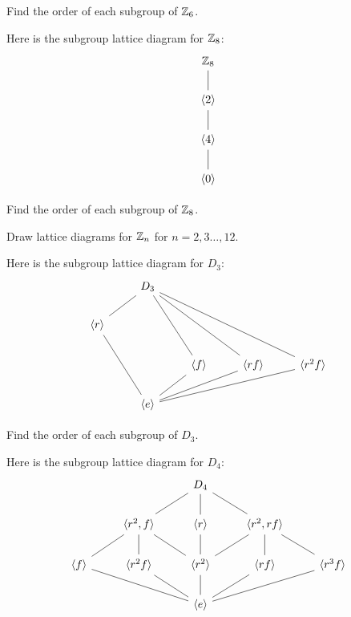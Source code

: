 \documentclass{ximera}
\begin{document}
\begin{exercise}
  Find the order of each subgroup of $\mathbb Z_6$.
\end{exercise}

\begin{example}
  Here is the subgroup lattice diagram for $\mathbb Z_8$:
  \[
  \begin{tikzcd}
    \Z_8  \ar[d,-] \\
    \<2\> \ar[d,-] \\
    \<4\> \ar[d,-] \\   
    \<0\> 
  \end{tikzcd}
  \]
\end{example}

\begin{exercise}
  Find the order of each subgroup of $\mathbb Z_8$.
\end{exercise}

\begin{exercise}
  Draw lattice diagrams for $\mathbb Z_n$ for $n=2,3\dots, 12$.
\end{exercise}

\begin{example}
  Here is the subgroup lattice diagram for $D_3$:
  \[
  \begin{tikzcd}
    & D_3 \ar[rdd,-]\ar[rrdd,-]\ar[rrrdd,-]  \ar[ld,-] & & &      \\
    \<r\> \ar[rdd,-]       &       &  & &  \\
    &       &  \< f\> \ar[ld,-]   &  \< rf\> \ar[lld,-]       &  \< r^2f\> \ar[llld,-]        \\   
    & \<e\> & & &
  \end{tikzcd}
  \]
\end{example}

\begin{exercise}
  Find the order of each subgroup of $D_3$.
\end{exercise}


\begin{example}
  Here is the subgroup lattice diagram for $D_4$:
  \[
  \begin{tikzcd}
    &    & D_4 \ar[rd,-] \ar[d,-] \ar[ld,-] &       \\
    &\<r^2,f\>  \ar[rd,-] \ar[d,-] \ar[ld,-]& \<r \>  \ar[d,-]     & \<r^2,rf\> \ar[ld,-] \ar[d,-] \ar[rd,-]\\
    \<f\>\ar[rrd,-]& \<r^2f\> \ar[rd,-]&\< r^2\> \ar[d,-]  &   \<rf\> \ar[ld,-]& \<r^3f\>\ar[lld,-]     \\   
&     & \<e\> &  &
  \end{tikzcd}
  \]  
\end{example}
\end{document}
